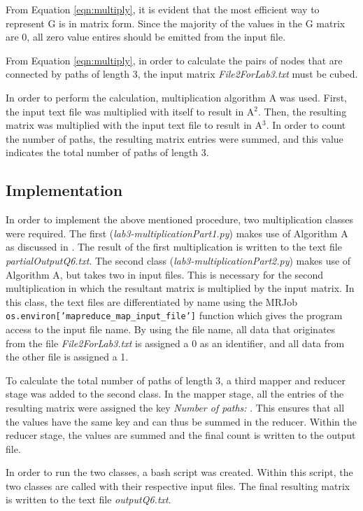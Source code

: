 \documentclass[10pt,twocolumn]{witseiepaper}
\begin{document}
From Equation \ref{eqn:multiply}, it is evident that the most efficient way to represent G is in matrix form. Since the majority of the values in the G matrix are 0, all zero value entires should be emitted from the input file.

From Equation \ref{eqn:multiply}, in order to calculate the pairs of nodes that are connected by paths of length 3, the input matrix \textit{File2ForLab3.txt} must be cubed.

In order to perform the calculation, multiplication algorithm A was used. First, the input text file was multiplied with itself to result in A$^{2}$. Then, the resulting matrix was multiplied with the input text file to result in A$^{3}$. In order to count the number of paths, the resulting matrix entries were summed, and this value indicates the total number of paths of length 3.

\subsection{Implementation} 
In order to implement the above mentioned procedure, two multiplication classes were required. The first (\textit{lab3-multiplicationPart1.py}) makes use of Algorithm A as discussed in . The result of the first multiplication is written to the text file \textit{partialOutputQ6.txt}. The second class (\textit{lab3-multiplicationPart2.py}) makes use of Algorithm A, but takes two in input files. This is necessary for the second multiplication in which the resultant matrix is multiplied by the input matrix. In this class, the text files are differentiated by name using the MRJob \texttt{os.environ['mapreduce\_map\_input\_file']} function which gives the program access to the input file name. By using the file name, all data that originates from the file \textit{File2ForLab3.txt} is assigned a 0 as an identifier, and all data from the other file is assigned a 1.

To calculate the total number of paths of length 3, a third mapper and reducer stage was added to the second class. In the mapper stage, all the entries of the resulting matrix were assigned the key \textit{Number of paths: }. This ensures that all the values have the same key and can thus be summed in the reducer. Within the reducer stage, the values are summed and the final count is written to the output file.

In order to run the two classes, a bash script was created. Within this script, the two classes are called with their respective input files. The final resulting matrix is written to the text file \textit{outputQ6.txt}. 



\end{document}
